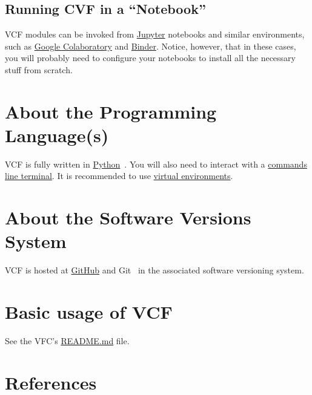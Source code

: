 \subsection{Running CVF in a ``Notebook''}
VCF modules can be invoked from \href{https://jupyter.org/}{Jupyter}
notebooks and similar environments, such as
\href{https://colab.research.google.com/}{Google Colaboratory} and
\href{https://mybinder.org/}{Binder}. Notice, however, that in these
cases, you will probably need to configure your notebooks to install
all the necessary stuff from scratch.

\section{About the Programming Language(s)}

VCF is fully written in
\href{https://www.python.org/}{Python}~\cite{vruiz__YAPT}. You will
also need to interact with a
\href{https://en.wikipedia.org/wiki/Command-line_interface}{commands
  line terminal}. It is recommended to use
\href{https://docs.python.org/3/library/venv.html}{virtual
  environments}.

\section{About the Software Versions System}

VCF is hosted at \href{https://github.com}{GitHub} and Git~\cite{vruiz__GitHub} in the associated software versioning system.

\section{Basic usage of VCF}

See the VFC's \href{https://github.com/Sistemas-Multimedia/VCF/blob/main/README.md}{README.md} file.

\section{References}

\renewcommand{\addcontentsline}[3]{}%

